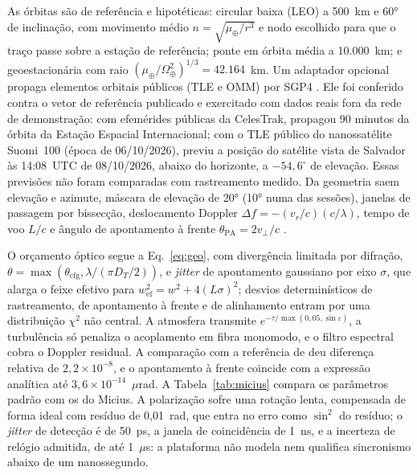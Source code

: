 \documentclass[12pt]{article}
\providecommand{\citeasnoun}[1]{\cite{#1}}
\begin{document}
As órbitas são de referência e hipotéticas: circular baixa (LEO) a 500~km e 60°
de inclinação, com movimento médio $n=\sqrt{\mu_\oplus/r^3}$ e nodo escolhido
para que o traço passe sobre a estação de referência; ponte em órbita média a
10.000~km; e geoestacionária com raio $(\mu_\oplus/\Omega_\oplus^2)^{1/3}=42.164$~km.
Um adaptador opcional propaga elementos orbitais públicos (TLE e OMM) por SGP4
\cite{vallado2006}. Ele foi conferido contra o vetor de referência publicado e
exercitado com dados reais fora da rede de demonstração: com efemérides públicas
da CelesTrak, propagou 90 minutos da órbita da Estação Espacial Internacional; com
o TLE público do nanossatélite Suomi~100 (época de 06/10/2026), previu a posição
do satélite vista de Salvador às 14:08~UTC de 08/10/2026, abaixo do horizonte, a
$-54{,}6^\circ$ de elevação. Essas previsões não foram comparadas com
rastreamento medido. Da geometria saem elevação e azimute,
máscara de elevação de 20° (10° numa das sessões), janelas de passagem por bissecção, deslocamento
Doppler $\Delta f=-(v_r/c)(c/\lambda)$, tempo de voo $L/c$ e ângulo de
apontamento à frente $\theta_{\mathrm{PA}}=2v_\perp/c$ \cite{han2018}.

O orçamento óptico segue a Eq.~\ref{eq:geo}, com divergência limitada por
difração, $\theta=\max(\theta_{\mathrm{cfg}},\lambda/(\pi D_T/2))$, e
\textit{jitter} de apontamento gaussiano por eixo $\sigma$, que alarga o feixe
efetivo para $w_{\mathrm{ef}}^2=w^2+4(L\sigma)^2$; desvios determinísticos de
rastreamento, de apontamento à frente e de alinhamento entram por uma
distribuição $\chi^2$ não central. A atmosfera transmite
$e^{-\tau/\max(0{,}05,\sin\varepsilon)}$, a turbulência só penaliza o acoplamento em
fibra monomodo, e o filtro espectral cobra o Doppler residual. A comparação com
a referência de \citeasnoun{wallnofer2022} deu diferença relativa de
$2{,}2\times10^{-8}$, e o apontamento à frente coincide com a expressão analítica
até $3{,}6\times10^{-14}$~$\mu$rad. A Tabela~\ref{tab:micius} compara os parâmetros
padrão com os do Micius. A polarização sofre uma rotação lenta, compensada de
forma ideal com resíduo de 0,01~rad, que entra no erro como $\sin^2$ do resíduo;
o \textit{jitter} de detecção é de 50~ps, a janela de coincidência de 1~ns, e a
incerteza de relógio admitida, de até 1~$\mu$s: a plataforma não modela nem
qualifica sincronismo abaixo de um nanossegundo.
\end{document}

